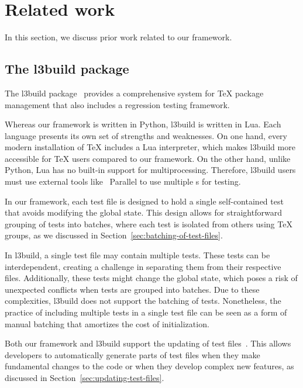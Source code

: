 \documentclass[final]{ltugboat}
\begin{document}
\section{Related work}
\label{sec:related-work}

In this section, we discuss prior work related to our framework.

\subsection{The l3build package}
The l3build package~\cite{mittelbach2014l3build, wright2015automating, wright2022l3build, latex2023l3build} provides a comprehensive system for \TeX{} package management that also includes a regression testing framework.

Whereas our framework is written in Python, l3build is written in Lua. Each language presents its own set of strengths and weaknesses. On one hand, every modern installation of \TeX{} includes a Lua interpreter, which makes l3build more accessible for \TeX{} users compared to our framework. On the other hand, unlike Python, Lua has no built-in support for multiprocessing. Therefore, l3build users must use external tools like ~Parallel to use multiple s for testing.

In our framework, each test file is designed to hold a single self-contained test that avoids modifying the global state. This design allows for straightforward grouping of tests into batches, where each test is isolated from others using \TeX{} groups, as we discussed in Section~\ref{sec:batching-of-test-files}.

In l3build, a single test file may contain multiple tests. These tests can be interdependent, creating a challenge in separating them from their respective files. Additionally, these tests might change the global state, which poses a risk of unexpected conflicts when tests are grouped into batches. Due to these complexities, l3build does not support the batching of tests. Nonetheless, the practice of including multiple tests in a single test file can be seen as a form of manual batching that amortizes the cost of initialization.

Both our framework and l3build support the updating of test files~\cite[Section~2.7]{latex2023l3build}. This allows developers to automatically generate parts of test files when they make fundamental changes to the code or when they develop complex new features, as discussed in Section~\ref{sec:updating-test-files}.
\end{document}
